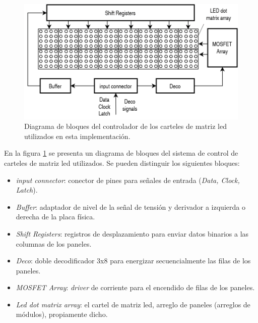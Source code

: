 \begin{figure}[ht]
	\centering
	\includegraphics[width=1\textwidth]{./Figures/diagDriverled.png}
	\caption{Diagrama de bloques del controlador de los carteles de matriz led utilizados en esta implementación.}
	\label{fig:diagDriverled}
\end{figure}

En la figura \ref{fig:diagDriverled} se presenta un diagrama de bloques del sistema de control de carteles de matriz led utilizados. Se pueden distinguir los siguientes bloques:

\begin{itemize}
\item \textit{input connector}: conector de pines para señales de entrada (\textit{Data, Clock, Latch}).
\item \textit{Buffer}: adaptador de nivel de la señal de tensión y derivador a izquierda o derecha de la placa física.
\item \textit{Shift Registers}: registros de desplazamiento para enviar datos binarios a las columnas de los paneles.
\item \textit{Deco}: doble decodificador 3x8 para energizar secuencialmente las filas de los paneles.
\item \textit{MOSFET Array}: \textit{driver} de corriente para el encendido de filas de los paneles.
\item \textit{Led dot matrix array}: el cartel de matriz led, arreglo de paneles (arreglos de módulos), propiamente dicho.
\end{itemize}

